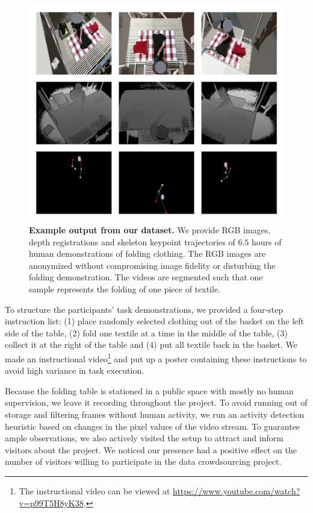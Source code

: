 \documentclass[\home/main.tex]{subfiles}
\begin{document}
\begin{figure}[htpb]
    \centering
    \includegraphics[width=\textwidth, height=0.70\textheight]{figures/3x3-sample} %
    \caption[Example output from our cloth folding dataset.]{\textbf{Example output from our dataset.} We provide RGB images, depth registrations and skeleton keypoint trajectories of $6.5$ hours of human demonstrations of folding clothing. The RGB images are anonymized without compromising image fidelity or disturbing the folding demonstration. The videos are segmented such that one sample represents the folding of one piece of textile.}
    \label{fig:fig1}
\end{figure}

To structure the participants' task demonstrations, we provided a four-step instruction list: (1) place randomly selected clothing out of the basket on the left side of the table, (2) fold one textile at a time in the middle of the table, (3) collect it at the right of the table and (4) put all textile back in the basket. We made an instructional video\footnote{The instructional video can be viewed at \url{https://www.youtube.com/watch?v=p99T5H8yK38}.} and put up a poster containing these instructions to avoid high variance in task execution.  \par

Because the folding table is stationed in a public space with mostly no human supervision, we leave it recording throughout the project. To avoid running out of storage and filtering frames without human activity, we run an activity detection heuristic based on changes in the pixel values of the video stream. To guarantee ample observations, we also actively visited the setup to attract and inform visitors about the project. We noticed our presence had a positive effect on the number of visitors willing to participate in the data crowdsourcing project. \par
\end{document}
